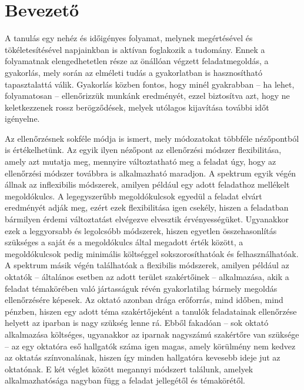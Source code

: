 \chapter*{Bevezető}

A tanulás egy nehéz és időigényes folyamat, melynek megértésével és tökéletesítésével napjainkban is aktívan foglakozik a tudomány.
Ennek a folyamatnak elengedhetetlen része az önállóan végzett feladatmegoldás, a gyakorlás, mely során az elméleti tudás a gyakorlatban is hasznosítható tapasztalattá válik.
Gyakorlás közben fontos, hogy minél gyakrabban -- ha lehet, folyamatosan -- ellenőrizzük munkánk eredményét, ezzel biztosítva azt, hogy ne keletkezzenek rossz berögződések, melyek utólagos kijavítása további időt igényelne.

Az ellenőrzésnek sokféle módja is ismert, mely módozatokat többféle nézőpontból is értékelhetünk.
Az egyik ilyen nézőpont az ellenőrzési módszer flexibilitása, amely azt mutatja meg, mennyire változtatható meg a feladat úgy, hogy az ellenőrzési módszer továbbra is alkalmazható maradjon.
A spektrum egyik végén állnak az inflexibilis módszerek, amilyen például egy adott feladathoz mellékelt megoldókulcs.
A legegyszerűbb megoldókulcsok egyedül a feladat elvárt eredményét adják meg, ezért ezek flexibilitása igen csekély, hiszen a feladatban bármilyen érdemi változtatást elvégezve elvesztik érvényességüket. 
Ugyanakkor ezek a leggyorsabb és legolcsóbb módszerek, hiszen egyetlen összehasonlítás szükséges a saját és a megoldókulcs által megadott érték között, a megoldókulcsok pedig minimális költséggel sokszorosíthatóak és felhasználhatóak.
A spektrum másik végén találhatóak a flexibilis módszerek, amilyen például az oktatók -- általános esetben az adott terület szakértőinek -- alkalmazása, akik a feladat témakörében való jártasságuk révén gyakorlatilag bármely megoldás ellenőrzésére képesek.
Az oktató azonban drága erőforrás, mind időben, mind pénzben, hiszen egy adott téma szakértőjeként a tanulók feladatainak ellenőrzése helyett az iparban is nagy szükség lenne rá.
Ebből fakadóan -- sok oktató alkalmazása költséges, ugyanakkor az iparnak nagyszámú szakértőre van szüksége -- az egy oktatóra eső hallgatók száma igen magas, amely körülmény nem kedvez az oktatás színvonalának, hiszen így minden hallgatóra kevesebb ideje jut az oktatónak.
E két véglet között megannyi módszert találunk, amelyek alkalmazhatósága nagyban függ a feladat jellegétől és témakörétől.

